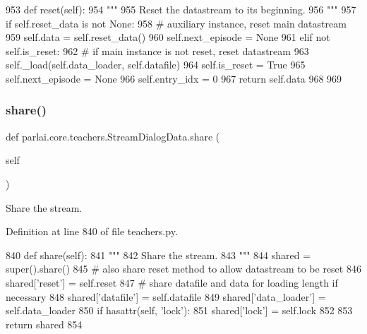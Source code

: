 \begin{DoxyCode}
953     \textcolor{keyword}{def }reset(self):
954         \textcolor{stringliteral}{"""}
955 \textcolor{stringliteral}{        Reset the datastream to its beginning.}
956 \textcolor{stringliteral}{        """}
957         \textcolor{keywordflow}{if} self.reset\_data \textcolor{keywordflow}{is} \textcolor{keywordflow}{not} \textcolor{keywordtype}{None}:
958             \textcolor{comment}{# auxiliary instance, reset main datastream}
959             self.data = self.reset\_data()
960             self.next\_episode = \textcolor{keywordtype}{None}
961         \textcolor{keywordflow}{elif} \textcolor{keywordflow}{not} self.is\_reset:
962             \textcolor{comment}{# if main instance is not reset, reset datastream}
963             self.\_load(self.data\_loader, self.datafile)
964             self.is\_reset = \textcolor{keyword}{True}
965             self.next\_episode = \textcolor{keywordtype}{None}
966         self.entry\_idx = 0
967         \textcolor{keywordflow}{return} self.data
968 
969 
\end{DoxyCode}
\mbox{\label{classparlai_1_1core_1_1teachers_1_1StreamDialogData_a6bb0ef8ed4a3360184f715e8fab9b3aa}} 
\subsubsection{\texorpdfstring{share()}{share()}}
{\footnotesize\ttfamily def parlai.\+core.\+teachers.\+Stream\+Dialog\+Data.\+share (\begin{DoxyParamCaption}\item[{}]{self }\end{DoxyParamCaption})}

\begin{DoxyVerb}Share the stream.
\end{DoxyVerb}
 

Definition at line 840 of file teachers.\+py.


\begin{DoxyCode}
840     \textcolor{keyword}{def }share(self):
841         \textcolor{stringliteral}{"""}
842 \textcolor{stringliteral}{        Share the stream.}
843 \textcolor{stringliteral}{        """}
844         shared = super().share()
845         \textcolor{comment}{# also share reset method to allow datastream to be reset}
846         shared[\textcolor{stringliteral}{'reset'}] = self.reset
847         \textcolor{comment}{# share datafile and data for loading length if necessary}
848         shared[\textcolor{stringliteral}{'datafile'}] = self.datafile
849         shared[\textcolor{stringliteral}{'data\_loader'}] = self.data\_loader
850         \textcolor{keywordflow}{if} hasattr(self, \textcolor{stringliteral}{'lock'}):
851             shared[\textcolor{stringliteral}{'lock'}] = self.lock
852 
853         \textcolor{keywordflow}{return} shared
854 
\end{DoxyCode}


